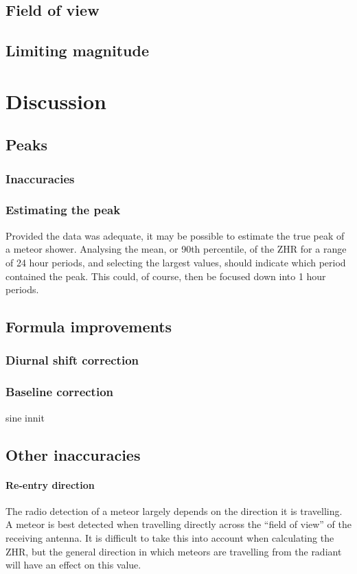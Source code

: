 \subsection{Field of view}
\subsection{Limiting magnitude}
\section{Discussion}
\subsection{Peaks}
\subsubsection{Inaccuracies}
\subsubsection{Estimating the peak}
Provided the data was adequate, it may be possible to estimate the true peak of a meteor shower. Analysing the mean, or 90th percentile, of the ZHR for a range of 24 hour periods, and selecting the largest values, should indicate which period contained the peak. This could, of course, then be focused down into 1 hour periods.
\subsection{Formula improvements}
\subsubsection{Diurnal shift correction}
\subsubsection{Baseline correction}
sine innit
\subsection{Other inaccuracies}
\paragraph{Re-entry direction}
The radio detection of a meteor largely depends on the direction it is travelling. A meteor is best detected when travelling directly across the ``field of view'' of the receiving antenna. It is difficult to take this into account when calculating the ZHR, but the general direction in which meteors are travelling from the radiant will have an effect on this value.
